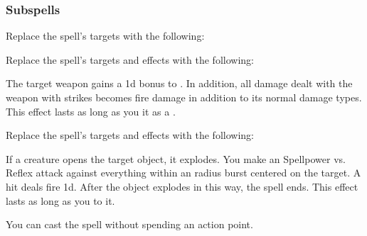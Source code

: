 \subsubsection{Subspells}
Replace the spell's targets with the following:
\begin{spellcontent}
\begin{augmenttargetinginfo}
\end{augmenttargetinginfo}
\end{spellcontent}
Replace the spell's targets and effects with the following:
\begin{spellcontent}
\begin{augmenttargetinginfo}
\end{augmenttargetinginfo}
\begin{augmenteffects}
\spelleffect
The target weapon gains a \plus1d bonus to .
In addition, all damage dealt with the weapon with strikes becomes fire damage in addition to its normal damage types.
This effect lasts as long as you  it as a .
\end{augmenteffects}
\end{spellcontent}
Replace the spell's targets and effects with the following:
\begin{spellcontent}
\begin{augmenttargetinginfo}
\end{augmenttargetinginfo}
\begin{augmenteffects}
\spelleffect
If a creature opens the target object, it explodes.
You make an Spellpower vs. Reflex attack against everything within an \areamed radius burst centered on the target.
A hit deals fire  \minus1d.
After the object explodes in this way, the spell ends.
This effect lasts as long as you  to it.
\end{augmenteffects}
\end{spellcontent}
You can cast the spell without spending an action point.
